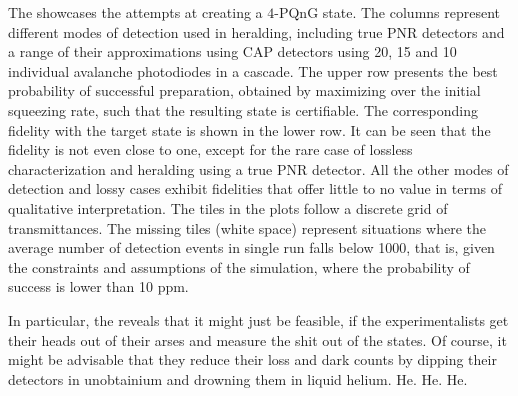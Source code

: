 \documentclass{article}
\begin{document}
The  showcases the attempts at creating a $4$-PQnG state. The columns represent different modes of detection used in heralding, including true PNR detectors and a range of their approximations using CAP detectors using 20, 15 and 10 individual avalanche photodiodes in a cascade. The upper row presents the best probability of successful preparation, obtained by maximizing over the initial squeezing rate, such that the resulting state is certifiable. The corresponding fidelity with the target state is shown in the lower row. It can be seen that the fidelity is not even close to one, except for the rare case of lossless characterization and heralding using a true PNR detector. All the other modes of detection and lossy cases exhibit fidelities that offer little to no value in terms of qualitative interpretation. The tiles in the plots follow a discrete grid of transmittances. The missing tiles (white space) represent situations where the average number of detection events in single run falls below 1000, that is, given the constraints and assumptions of the simulation, where the probability of success is lower than 10 ppm.

In particular, the  reveals that it might just be feasible, if the experimentalists get their heads out of their arses and measure the shit out of the states. Of course, it might be advisable that they reduce their loss and dark counts by dipping their detectors in unobtainium and drowning them in liquid helium. He. He. He.



\end{document}
